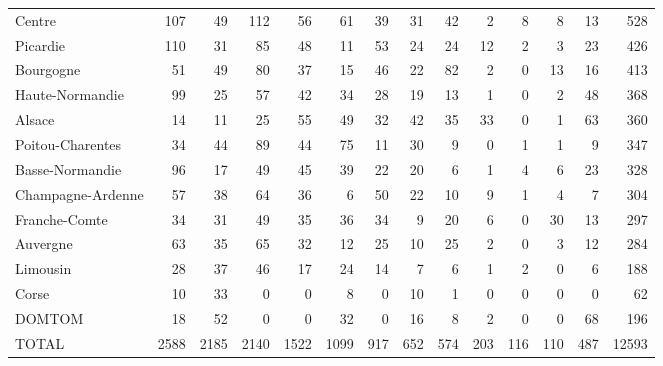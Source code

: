 \documentclass[11pt]{article}
\begin{document}
\begin{table}[H]
\begin{tabular}{lrrrrrrrrrrrrr}
Centre                     &    107 &     49 &        112 &         56 &     61 &         39 &     31 &         42 &          2 &          8 &          8 &         13 &        528 \\
Picardie                   &    110 &     31 &         85 &         48 &     11 &         53 &     24 &         24 &         12 &          2 &          3 &         23 &        426 \\
Bourgogne                  &     51 &     49 &         80 &         37 &     15 &         46 &     22 &         82 &          2 &          0 &         13 &         16 &        413 \\
Haute-Normandie            &     99 &     25 &         57 &         42 &     34 &         28 &     19 &         13 &          1 &          0 &          2 &         48 &        368 \\
Alsace                     &     14 &     11 &         25 &         55 &     49 &         32 &     42 &         35 &         33 &          0 &          1 &         63 &        360 \\
Poitou-Charentes           &     34 &     44 &         89 &         44 &     75 &         11 &     30 &          9 &          0 &          1 &          1 &          9 &        347 \\
Basse-Normandie            &     96 &     17 &         49 &         45 &     39 &         22 &     20 &          6 &          1 &          4 &          6 &         23 &        328 \\
Champagne-Ardenne          &     57 &     38 &         64 &         36 &      6 &         50 &     22 &         10 &          9 &          1 &          4 &          7 &        304 \\
Franche-Comte              &     34 &     31 &         49 &         35 &     36 &         34 &      9 &         20 &          6 &          0 &         30 &         13 &        297 \\
Auvergne                   &     63 &     35 &         65 &         32 &     12 &         25 &     10 &         25 &          2 &          0 &          3 &         12 &        284 \\
Limousin                   &     28 &     37 &         46 &         17 &     24 &         14 &      7 &          6 &          1 &          2 &          0 &          6 &        188 \\
Corse                      &     10 &     33 &          0 &          0 &      8 &          0 &     10 &          1 &          0 &          0 &          0 &          0 &         62 \\
DOMTOM                     &     18 &     52 &          0 &          0 &     32 &          0 &     16 &          8 &          2 &          0 &          0 &         68 &        196 \\
\midrule
TOTAL & 2588 & 2185 & 2140 & 1522 & 1099 &  917 &  652 &  574 &  203 &  116 &  110 &  487 & 12593 \\
\bottomrule
\end{tabular}

\end{table}
\end{document}
